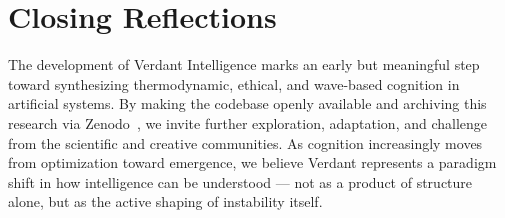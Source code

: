 \documentclass{article}
\begin{document}
\section*{Closing Reflections}

The development of Verdant Intelligence marks an early but meaningful step toward synthesizing thermodynamic, ethical, and wave-based cognition in artificial systems. By making the codebase openly available and archiving this research via Zenodo~\cite{verdant2025}, we invite further exploration, adaptation, and challenge from the scientific and creative communities. As cognition increasingly moves from optimization toward emergence, we believe Verdant represents a paradigm shift in how intelligence can be understood — not as a product of structure alone, but as the active shaping of instability itself.




\end{document}
